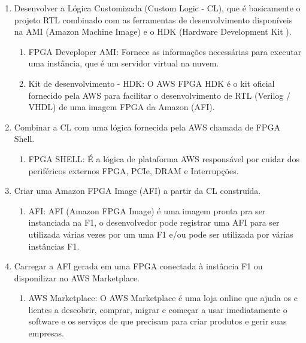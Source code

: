 \documentclass[conference]{IEEEtran}
\begin{document}
	\begin{enumerate}
		\item Desenvolver a Lógica Customizada (Custom Logic - CL), que é basicamente o projeto RTL combinado com as ferramentas de desenvolvimento disponíveis na AMI  (Amazon Machine Image) e o HDK (Hardware Development Kit ).
		\begin{enumerate}
			\item FPGA Deveploper
			AMI: Fornece as informações necessárias para executar uma instância, que é um servidor virtual na nuvem. 
			\item Kit de desenvolvimento - HDK: 
			O AWS FPGA HDK é o kit oficial fornecido pela AWS para facilitar o desenvolvimento de RTL (Verilog / VHDL) de uma imagem FPGA da Amazon (AFI).
		\end{enumerate}
		\item Combinar a CL com uma lógica fornecida pela AWS chamada de FPGA Shell.
		\begin{enumerate}
			\item FPGA SHELL: É a lógica de plataforma AWS responsável por cuidar dos periféricos externos FPGA, PCIe, DRAM e Interrupções.
		\end{enumerate}
		\item Criar uma Amazon FPGA Image (AFI) a partir da CL construída.
		\begin{enumerate}
			\item AFI: AFI (Amazon FPGA Image) é uma imagem pronta pra ser instanciada na F1, o desenvolvedor pode registrar uma AFI para ser utilizada várias vezes por um uma F1 e/ou pode ser utilizada por várias instâncias F1. 
		\end{enumerate}
		\item Carregar a AFI gerada em uma FPGA conectada à instância F1 ou disponilizar no AWS Marketplace.
		\begin{enumerate}
			\item AWS Marketplace: O AWS Marketplace é uma loja online que ajuda os c
			lientes a descobrir, comprar, migrar e começar a usar imediatamente o software e os serviços de que precisam para criar produtos e gerir suas empresas.  
		\end{enumerate}
	\end{enumerate}
\end{document}
